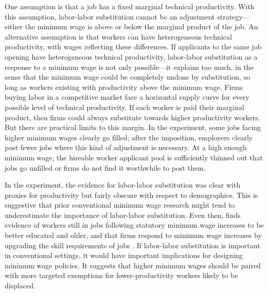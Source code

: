 \documentclass[AER]{AEA}
\begin{document}
One assumption is that a job has a fixed marginal technical productivity.
With this assumption, labor-labor substitution cannot be an adjustment strategy---either the minimum wage is above or below the marginal product of the job.
An alternative assumption is that workers can have heterogeneous technical productivity, with wages reflecting these differences. 
If applicants to the same job opening have heterogeneous technical productivity, labor-labor substitution as a response to a minimum wage is not only possible---it explains too much, in the sense that the minimum wage could be completely undone by substitution, so long as workers existing with productivity above the minimum wage.
Firms buying labor in a competitive market face a horizontal supply curve for every possible level of technical productivity.
If each worker is paid their marginal product, then firms could always substitute towards higher productivity workers. 
But there are practical limits to this margin. 
In the experiment, some jobs facing higher minimum wages clearly go filled; after the imposition, employers clearly post fewer jobs where this kind of adjustment is necessary.
At a high enough minimum wage, the hireable worker applicant pool is sufficiently thinned out that jobs go unfilled or firms do not find it worthwhile to post them.

In the experiment, the evidence for labor-labor substitution was clear with proxies for productivity but fairly obscure with respect to demographics.
This is suggestive that prior conventional minimum wage research might tend to underestimate the importance of labor-labor substitution.
Even then, \cite{clemens2021dropouts} finds evidence of workers still in jobs following statutory minimum wage increases to be better educated and older, and that firms respond to minimum wage increases by upgrading the skill requirements of jobs \citep{clemens2021dropouts}. 
If labor-labor substitution is important in conventional settings, it would have important implications for designing minimum wage policies.  
It suggests that higher minimum wages should be paired with more targeted exemptions for lower-productivity workers likely to be displaced.

\end{document}
